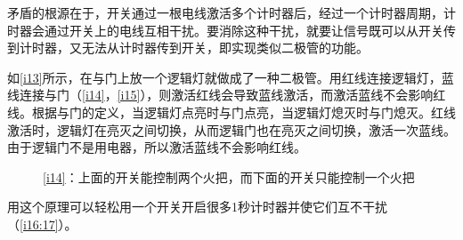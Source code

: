 矛盾的根源在于，开关通过一根电线激活多个计时器后，经过一个计时器周期，计时器会通过开关上的电线互相干扰。要消除这种干扰，就要让信号既可以从开关传到计时器，又无法从计时器传到开关，即实现类似二极管的功能。

如\autoref{i13}所示，在与门上放一个逻辑灯就做成了一种二极管。用红线连接逻辑灯，蓝线连接与门（\autoref{i14}，\autoref{i15}），则激活红线会导致蓝线激活，而激活蓝线不会影响红线。根据与门的定义，当逻辑灯点亮时与门点亮，当逻辑灯熄灭时与门熄灭。红线激活时，逻辑灯在亮灭之间切换，从而逻辑门也在亮灭之间切换，激活一次蓝线。由于逻辑门不是用电器，所以激活蓝线不会影响红线。

\begin{figure}[!h]
\begin{center}
\qquad
{}
\end{center}
\caption{\ref{i14}\protect{}：上面的开关能控制两个火把，而下面的开关只能控制一个火把}
\label{i13:15}
\end{figure}

用这个原理可以轻松用一个开关开启很多1秒计时器并使它们互不干扰（\autoref{i16:17}）。

\begin{figure}[!h]
\begin{center}
\end{center}
\caption{}
\label{i16:17}
\end{figure}

